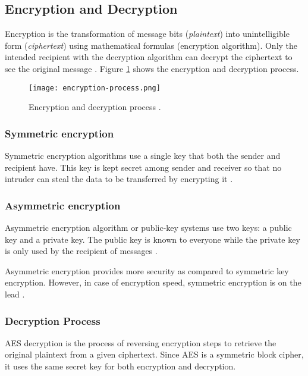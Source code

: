 \subsection{Encryption and Decryption}

Encryption is the transformation of message bits (\textit{plaintext}) into unintelligible form (\textit{ciphertext}) using mathematical formulas (encryption algorithm).
Only the intended recipient with the decryption algorithm can decrypt the ciphertext to see the original message \cite{Devi_2019}.
Figure \ref{fig:encryption-process.png} shows the encryption and decryption process.

\begin{figure}[!ht]
    \centering
    \texttt{[image: encryption-process.png]}
    \caption{Encryption and decryption process \cite{Bhanot_2015}.}
    \label{fig:encryption-process.png}
\end{figure}


\subsubsection{Symmetric encryption}

Symmetric encryption algorithms use a single key that both the sender and recipient have.
This key is kept secret among sender and receiver so that no intruder can steal the data to be transferred by encrypting it  \cite{Bhanot_2015}.


\subsubsection{Asymmetric encryption}

Asymmetric encryption algorithm or public-key systems use two keys: a public key and a private key.
The public key is known to everyone while the private key is only used by the recipient of messages \cite{Bhanot_2015}.

Asymmetric encryption provides more security as compared to symmetric key encryption.
However, in case of encryption speed, symmetric encryption is on the lead \cite{Bhanot_2015}.

\subsubsection{Decryption Process}
\label{sec:decryption}

AES decryption is the process of reversing encryption steps to retrieve the original plaintext from a given ciphertext. Since AES is a symmetric block cipher, it uses the same secret key for both encryption and decryption\cite{NIST_AES}.

